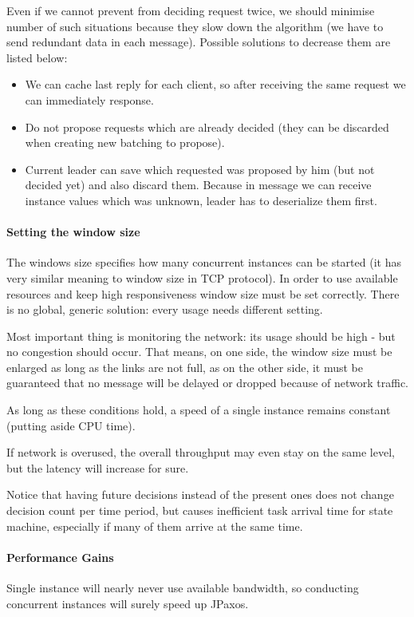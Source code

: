 Even if we cannot prevent from deciding request twice, we should minimise number of such situations because they slow down the algorithm (we have to send redundant data in each message). Possible solutions to decrease them are listed below:
\begin{itemize}
  \item We can cache last reply for each client, so after receiving the same request we can immediately response.
  \item Do not propose requests which are already decided (they can be discarded when creating new batching to propose). 
  \item Current leader can save which requested was proposed by him (but not decided yet) and also discard them. Because in \prepareOK message we can receive instance values which was unknown, leader has to deserialize them first.
\end{itemize}

\paragraph{Setting the window size}
The windows size specifies how many concurrent instances can be started (it has very similar meaning to window size in TCP protocol). In order to use available resources and keep high responsiveness window size must be set correctly. There is no global, generic solution: every usage needs different setting.

Most important thing is monitoring the network: its usage should be high - but no congestion should occur.
That means, on one side, the window size must be enlarged as long as the links are not full, as on the other side, it must be guaranteed that no message will be delayed or dropped because of network traffic.

As long as these conditions hold, a speed of a single instance remains constant (putting aside CPU time).

If network is overused, the overall throughput may even stay on the same level, but the latency will increase for sure.

Notice that having future decisions instead of the present ones does not change decision count per time period, but causes inefficient task arrival time for state machine, especially if many of them arrive at the same time.

\paragraph{Performance Gains}
Single instance will nearly never use available bandwidth, so conducting concurrent instances will surely speed up JPaxos.


